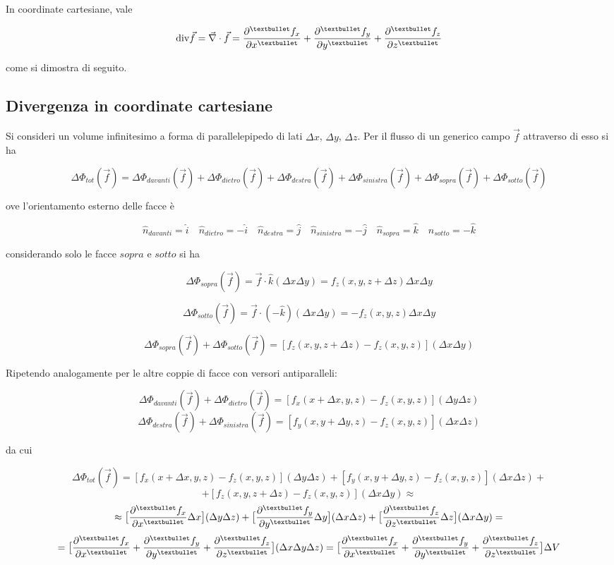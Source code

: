 
In coordinate cartesiane, vale

\[\mathrm{div} \vec{f} = \vec{\nabla} \cdot \vec{f} = \pdv[•]{f_x}{x} + \pdv[•]{f_y}{y} + \pdv[•]{f_z}{z}\]

come si dimostra di seguito.

\subsection{Divergenza in coordinate cartesiane}
Si consideri un volume infinitesimo a forma di parallelepipedo di lati $\Delta x$, $\Delta y$, $\Delta z$. Per il flusso di un generico campo $\vec{f}$ attraverso di esso si ha

\[\Delta \Phi_{tot}(\vec{f}) = \Delta \Phi_{davanti}(\vec{f}) + \Delta \Phi_{dietro}(\vec{f}) + \Delta \Phi_{destra}(\vec{f}) + \Delta \Phi_{sinistra}(\vec{f}) + \Delta \Phi_{sopra}(\vec{f}) + \Delta \Phi_{sotto}(\vec{f})\]

ove l'orientamento esterno delle facce è

\[\hat{n}_{davanti} = \hat{i} \quad \hat{n}_{dietro} = -\hat{i} \quad \hat{n}_{destra} = \hat{j} \quad \hat{n}_{sinistra} = -\hat{j} \quad \hat{n}_{sopra} = \hat{k} \quad \hat{n}_{sotto} = -\hat{k}\]

considerando solo le facce $sopra$ e $sotto$ si ha

\[\Delta \Phi_{sopra}(\vec{f}) = \vec{f} \cdot \hat{k} (\Delta x \Delta y) = f_z(x,y,z + \Delta z) \Delta x \Delta y\]

\[\Delta \Phi_{sotto}(\vec{f}) = \vec{f} \cdot (- \hat{k}) (\Delta x \Delta y) = - f_z(x,y,z) \Delta x \Delta y\]

\[\Delta \Phi_{sopra}(\vec{f}) + \Delta \Phi_{sotto}(\vec{f}) = [f_z(x,y,z + \Delta z) - f_z(x,y,z)] (\Delta x \Delta y)\]

Ripetendo analogamente per le altre coppie di facce con versori antiparalleli:

\[\Delta \Phi_{davanti}(\vec{f}) + \Delta \Phi_{dietro}(\vec{f}) = [f_x(x + \Delta x,y,z) - f_z(x,y,z)] (\Delta y \Delta z)\]
\[\Delta \Phi_{destra}(\vec{f}) + \Delta \Phi_{sinistra}(\vec{f}) = [f_y(x,y + \Delta y,z) - f_z(x,y,z)] (\Delta x \Delta z)\]

da cui

\[\Delta \Phi_{tot}(\vec{f}) = [f_x(x + \Delta x,y,z) - f_z(x,y,z)] (\Delta y \Delta z) + [f_y(x,y + \Delta y,z) - f_z(x,y,z)] (\Delta x \Delta z) + \]
\[ + [f_z(x,y,z + \Delta z) - f_z(x,y,z)] (\Delta x \Delta y) \approx \]
\[\approx \big[\pdv[•]{f_x}{x} \Delta x\big](\Delta y \Delta z) + \big[\pdv[•]{f_y}{y} \Delta y\big](\Delta x \Delta z) + \big[\pdv[•]{f_z}{z} \Delta z\big](\Delta x \Delta y) = \]
\[= \big[\pdv[•]{f_x}{x} + \pdv[•]{f_y}{y} + \pdv[•]{f_z}{z}\big](\Delta x \Delta y \Delta z) = \big[\pdv[•]{f_x}{x} + \pdv[•]{f_y}{y} + \pdv[•]{f_z}{z}\big] \Delta V\]

